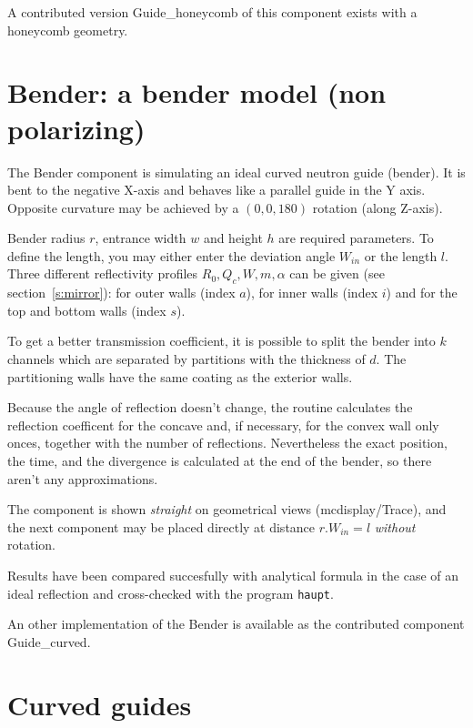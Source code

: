 A contributed version Guide\_honeycomb of this component exists with a honeycomb geometry.

\section{Bender: a bender model (non polarizing)}


The Bender component is simulating an ideal curved neutron guide (bender). It is bent to the negative X-axis and behaves like a parallel guide in the Y axis. Opposite curvature may be achieved by a $(0,0,180)$ rotation (along Z-axis).

Bender radius $r$, entrance width $w$ and height $h$ are required parameters. To define the length, you may either enter the deviation angle $W_{in}$ or the length $l$. Three different reflectivity profiles $R_0,Q_c,W,m,\alpha$ can be given (see section~\ref{s:mirror}): for outer
walls (index $a$), for inner walls (index $i$) and for the top and bottom walls (index $s$).

To get a better transmission coefficient, it is possible to split the bender into $k$ channels which are separated by partitions with the thickness of $d$. The partitioning walls have the same coating as the exterior walls.

Because the angle of reflection doesn't change, the routine
calculates the reflection coefficent for the concave and, if necessary, for the convex wall only onces, together with the number of reflections.
Nevertheless the exact position, the time, and the divergence is calculated at the end of the bender, so there aren't any approximations.

The component is shown \emph{straight} on geometrical views (mcdisplay/Trace), and the next component may be placed directly at distance $r.W_{in} = l$ \emph{without} rotation.

Results have been compared succesfully with analytical formula in the case of an ideal reflection and cross-checked with the program \verb+haupt+.

An other implementation of the Bender is available as the contributed component Guide\_curved.

\section{Curved guides}

